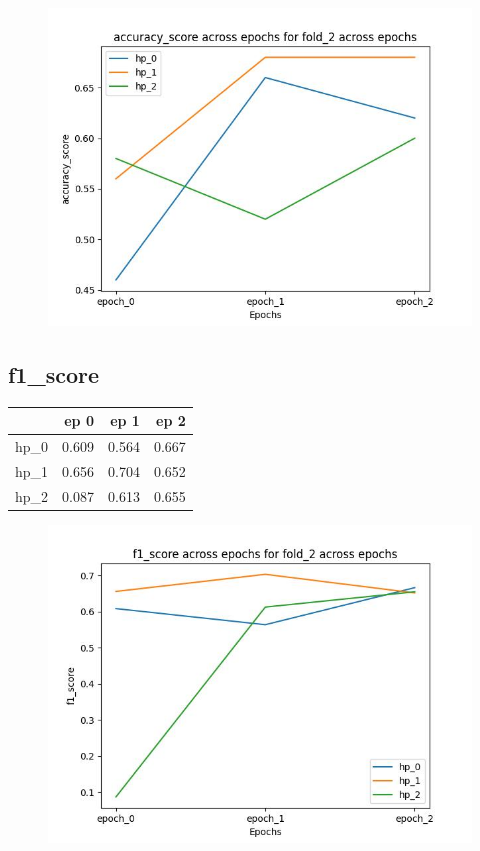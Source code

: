 \documentclass{article}
\begin{document}
\begin{figure}[H]
\includegraphics[scale = 0.75]{fold_2/accuracy_score}
\end{figure}
\subsection{f1\_score}
\begin{tabular}{lrrr}
\toprule
{} &   ep 0 &   ep 1 &   ep 2 \\
\midrule
hp\_0 &  0.609 &  0.564 &  0.667 \\
hp\_1 &  0.656 &  0.704 &  0.652 \\
hp\_2 &  0.087 &  0.613 &  0.655 \\
\bottomrule
\end{tabular}

\begin{figure}[H]
\includegraphics[scale = 0.75]{fold_2/f1_score}
\end{figure}
\end{document}

